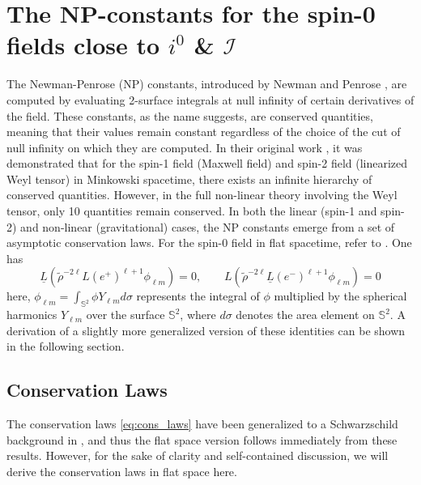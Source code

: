\chapter{The NP-constants for the spin-0 fields close to $i^0$ \& $\mathscr{I}$}
\label{chapter:NPConstants}


The Newman-Penrose (NP) constants, introduced by Newman and Penrose \cite{NewPen68}, are computed by evaluating 2-surface integrals at null infinity of certain derivatives of the field. These constants, as the name suggests, are conserved quantities, meaning that their values remain constant regardless of the choice of the cut of null infinity on which they are computed. In their original work \cite{NewPen68}, it was demonstrated that for the spin-1 field (Maxwell field) and spin-2 field (linearized Weyl tensor) in Minkowski spacetime, there exists an infinite hierarchy of conserved quantities. However, in the full non-linear theory involving the Weyl tensor, only 10 quantities remain conserved. In both the linear (spin-1 and spin-2) and non-linear (gravitational) cases, the NP constants emerge from a set of asymptotic conservation laws. For the spin-0 field in flat spacetime, refer to \cite{Keh21_a}. One has
\begin{equation}\label{eq:cons_laws}
  {\underline{{L}}}({\tilde{\rho}}^{-2\ell}L(e^{+})^{\ell+1}\phi_{\ell m})=0, \qquad L({\tilde{\rho}}^{-2\ell}\underline{L}(e^{-})^{\ell+1}\phi_{\ell m})=0
\end{equation}
here, $\phi_{\ell m}= \int_{\mathbb{S}^2} \phi  Y_{\ell m}  d\sigma$ represents the integral of $\phi$ multiplied by the spherical harmonics $Y_{\ell m}$ over the surface $\mathbb{S}^2$, where $d\sigma$ denotes the area element on $\mathbb{S}^2$. A derivation of a slightly more generalized version of these identities can be shown in the following section.

\section{Conservation Laws}
\label{sec:conservationlaws}

The conservation laws \eqref{eq:cons_laws} have been generalized to a Schwarzschild background in \cite{Keh21_a}, and thus the flat space version follows immediately from these results. However, for the sake of clarity and self-contained discussion, we will derive the conservation laws in flat space here.

